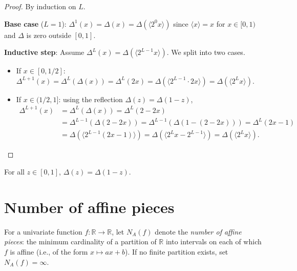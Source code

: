 \begin{proof}
  By induction on $L$.

  \textbf{Base case} ($L = 1$): $\Delta^1(x) = \Delta(x) = \Delta(\langle 2^0 x \rangle)$
  since $\langle x \rangle = x$ for $x \in [0,1)$ and $\Delta$ is zero outside $[0,1]$.

  \textbf{Inductive step}: Assume $\Delta^L(x) = \Delta(\langle 2^{L-1} x \rangle)$.
  We split into two cases.
  \begin{itemize}
    \item If $x \in [0, 1/2]$: $\Delta^{L+1}(x) = \Delta^L(\Delta(x)) = \Delta^L(2x)
      = \Delta(\langle 2^{L-1} \cdot 2x \rangle) = \Delta(\langle 2^L x \rangle)$.
    \item If $x \in (1/2, 1]$: using the reflection $\Delta(z) = \Delta(1-z)$,
      \begin{align*}
        \Delta^{L+1}(x) &= \Delta^L(\Delta(x)) = \Delta^L(2 - 2x) \\
        &= \Delta^{L-1}(\Delta(2-2x)) = \Delta^{L-1}(\Delta(1-(2-2x))) = \Delta^L(2x-1) \\
        &= \Delta(\langle 2^{L-1}(2x-1) \rangle) = \Delta(\langle 2^L x - 2^{L-1} \rangle)
        = \Delta(\langle 2^L x \rangle).
      \end{align*}
  \end{itemize}
\end{proof}

\begin{lemma}\label{lem:deltaTent_reflection}
For all $z \in [0,1]$, $\Delta(z) = \Delta(1-z)$.
\end{lemma}

\section{Number of affine pieces}\label{sec:affine-pieces}

\begin{definition}\label{def:numAffinePieces}
For a univariate function $f : \mathbb{R} \to \mathbb{R}$, let $N_A(f)$ denote the
\emph{number of affine pieces}: the minimum cardinality of a partition of $\mathbb{R}$
into intervals on each of which $f$ is affine (i.e., of the form $x \mapsto ax + b$).
If no finite partition exists, set $N_A(f) = \infty$.
\end{definition}

